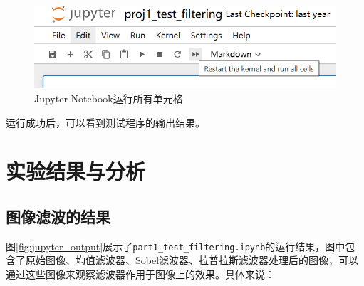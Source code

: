 \documentclass{article}
\begin{document}
\begin{figure}
    \centering
    \includegraphics[width=\textwidth]{images/jupyter_run_all.png}
    \caption{Jupyter Notebook运行所有单元格}
    \label{fig:jupyter_run_all}
\end{figure}

运行成功后，可以看到测试程序的输出结果。

\section{实验结果与分析}

\subsection{图像滤波的结果}

图\ref{fig:jupyter_output}展示了\texttt{part1\_test\_filtering.ipynb}的运行结果，图中包含了原始图像、均值滤波器、Sobel滤波器、拉普拉斯滤波器处理后的图像，可以通过这些图像来观察滤波器作用于图像上的效果。具体来说：
\end{document}
